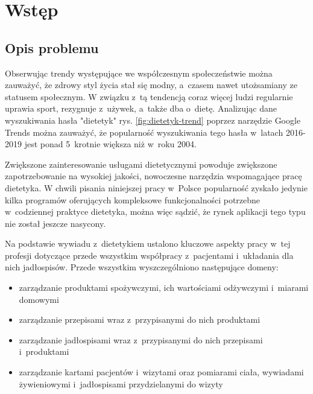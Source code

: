 \chapter*{Wstęp}\label{ch:admission}

\section*{Opis problemu}\label{sec:problem-description}

Obserwując trendy występujące we współczesnym społeczeństwie można zauważyć, że zdrowy styl życia stał się modny, a~czasem nawet utożsamiany ze statusem społecznym.
W związku z~tą tendencją coraz więcej ludzi regularnie uprawia sport, rezygnuje z~używek, a~także dba o~dietę.
Analizując dane wyszukiwania hasła "dietetyk" rys. \ref{fig:dietetyk-trend} poprzez narzędzie Google Trends\cite{url:google-trends} można zauważyć, że popularność wyszukiwania tego hasła w~latach 2016-2019 jest ponad 5~krotnie większa niż w~roku 2004.


Zwiększone zainteresowanie usługami dietetycznymi powoduje zwiększone zapotrzebowanie na wysokiej jakości, nowoczesne narzędzia wspomagające pracę dietetyka.
W chwili pisania niniejszej pracy w~Polsce popularność zyskało jedynie kilka programów oferujących kompleksowe funkcjonalności potrzebne w~codziennej praktyce dietetyka, można więc sądzić, że rynek aplikacji tego typu nie został jeszcze nasycony.

\par
Na podstawie wywiadu z~dietetykiem ustalono kluczowe aspekty pracy w~tej profesji dotyczące przede wszystkim współpracy z~pacjentami i~układania dla nich jadłospisów.
Przede wszystkim wyszczególniono następujące domeny:
\begin{itemize}
    \item zarządzanie produktami spożywczymi, ich wartościami odżywczymi i~miarami domowymi
    \item zarządzanie przepisami wraz z~przypisanymi do nich produktami
    \item zarządzanie jadłospisami wraz z~przypisanymi do nich przepisami i~produktami
    \item zarządzanie kartami pacjentów i~wizytami oraz pomiarami ciała, wywiadami żywieniowymi i~jadłospisami przydzielanymi do wizyty
\end{itemize}


